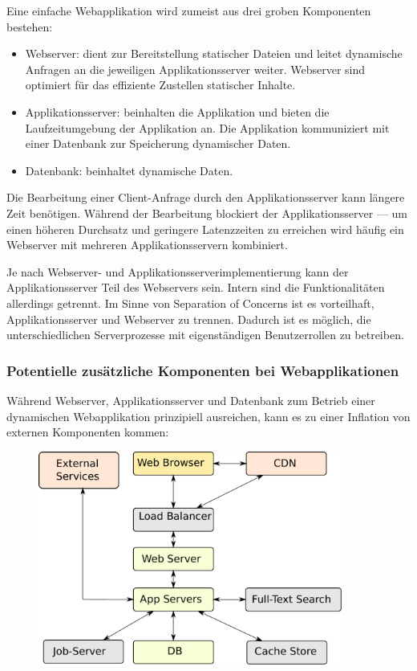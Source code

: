 Eine einfache Webapplikation wird zumeist aus drei groben Komponenten bestehen:

\begin{itemize}
	\item Webserver: dient zur Bereitstellung statischer Dateien und leitet dynamische Anfragen an die jeweiligen Applikationsserver weiter. Webserver sind optimiert für das effiziente Zustellen statischer Inhalte.
	\item Applikationsserver: beinhalten die Applikation und bieten die Laufzeitumgebung der Applikation an. Die Applikation kommuniziert mit einer Datenbank zur Speicherung dynamischer Daten.
	\item Datenbank: beinhaltet dynamische Daten.
\end{itemize}

Die Bearbeitung einer Client-Anfrage durch den Applikationsserver kann längere Zeit benötigen. Während der Bearbeitung blockiert der Applikationsserver --- um einen höheren Durchsatz und geringere Latenzzeiten zu erreichen wird häufig ein Webserver mit mehreren Applikationsservern kombiniert.

Je nach Webserver- und Applikationsserverimplementierung kann der Applikationsserver Teil des Webservers sein. Intern sind die Funktionalitäten allerdings getrennt. Im Sinne von Separation of Concerns ist es vorteilhaft, Applikationsserver und Webserver zu trennen. Dadurch ist es möglich, die unterschiedlichen Serverprozesse mit eigenständigen Benutzerrollen zu betreiben.

\subsubsection{Potentielle zusätzliche Komponenten bei Webapplikationen}

Während Webserver, Applikationsserver und Datenbank zum Betrieb einer dynamischen Webapplikation prinzipiell ausreichen, kann es zu einer Inflation von externen Komponenten kommen:

\begin{figure}[h!]
\includegraphics[width=10cm]{images/web_components.pdf}
\centering
\end{figure}

